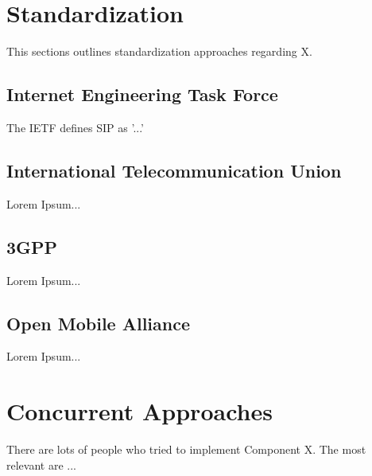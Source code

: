\section{Standardization \label{sec:standard}}

This sections outlines standardization approaches regarding X.

\subsection{Internet Engineering Task Force\label{sec:itu}}

The IETF defines SIP as '...' \cite{rfcsip}

\subsection{International Telecommunication Union\label{sec:itu}}

Lorem Ipsum...

\subsection{3GPP\label{sec:3gpp}}

Lorem Ipsum...

\subsection{Open Mobile Alliance\label{sec:oma}}

Lorem Ipsum...

\section{Concurrent Approaches \label{sec:summ}}

There are lots of people who tried to implement Component X. The most relevant are ...